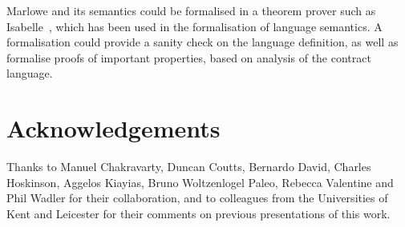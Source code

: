 \documentclass[runningheads]{llncs}
\begin{document}
Marlowe and its semantics could be formalised in a theorem prover such as Isabelle~\cite{IsabelleHOL}, which has been 
used in the formalisation of language semantics. A formalisation could provide a sanity check on the language 
definition, as well as formalise proofs of important properties, based on analysis of the contract language.

\section{Acknowledgements}

Thanks to Manuel Chakravarty, Duncan Coutts, Bernardo David, Charles Hoskinson, Aggelos Kiayias, %
Bruno Woltzenlogel Paleo, Rebecca Valentine and Phil Wadler for their collaboration, and to colleagues from the Universities of 
Kent and Leicester for their comments on previous presentations of this work.





\end{document}
